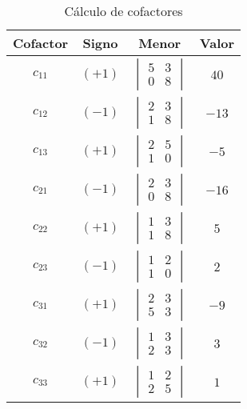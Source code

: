 \begin{prob}
\begin{myproof}
\begin{table}[H]
\centering
\begin{tabular}{|c|c|c|c|}
\hline
\textbf{Cofactor} & \textbf{Signo} & \textbf{Menor} & \textbf{Valor} \\
\hline
$c_{11}$ & $(+1)$ & $\begin{vmatrix} 5 & 3 \\ 0 & 8 \end{vmatrix}$ & $40$ \\
\hline
$c_{12}$ & $(-1)$ & $\begin{vmatrix} 2 & 3 \\ 1 & 8 \end{vmatrix}$ & $-13$ \\
\hline
$c_{13}$ & $(+1)$ & $\begin{vmatrix} 2 & 5 \\ 1 & 0 \end{vmatrix}$ & $-5$ \\
\hline
$c_{21}$ & $(-1)$ & $\begin{vmatrix} 2 & 3 \\ 0 & 8 \end{vmatrix}$ & $-16$ \\
\hline
$c_{22}$ & $(+1)$ & $\begin{vmatrix} 1 & 3 \\ 1 & 8 \end{vmatrix}$ & $5$ \\
\hline
$c_{23}$ & $(-1)$ & $\begin{vmatrix} 1 & 2 \\ 1 & 0 \end{vmatrix}$ & $2$ \\
\hline
$c_{31}$ & $(+1)$ & $\begin{vmatrix} 2 & 3 \\ 5 & 3 \end{vmatrix}$ & $-9$ \\
\hline
$c_{32}$ & $(-1)$ & $\begin{vmatrix} 1 & 3 \\ 2 & 3 \end{vmatrix}$ & $3$ \\
\hline
$c_{33}$ & $(+1)$ & $\begin{vmatrix} 1 & 2 \\ 2 & 5 \end{vmatrix}$ & $1$ \\
\hline
\end{tabular}
\caption{Cálculo de cofactores}
\label{tab:cofactores}
\end{table}


\end{myproof}
\end{prob}
